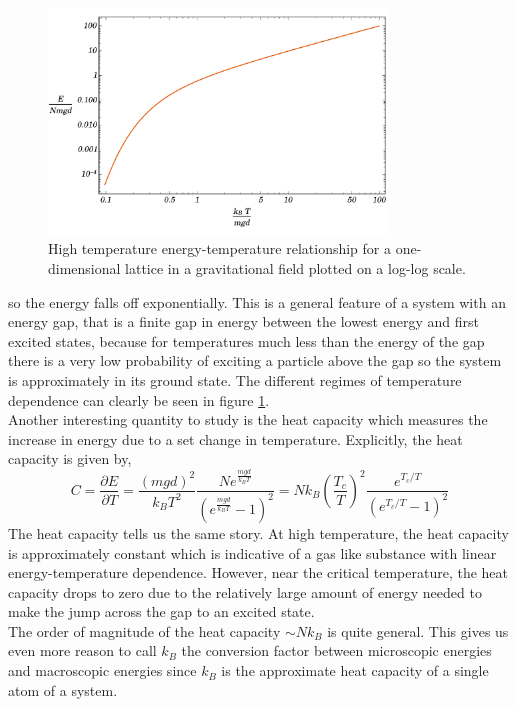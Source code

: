 \documentclass[11pt,a4paper]{article}
\newcommand{\pderiv}[2]{\frac{\partial{#1}}{\partial{#2}}}
\theoremstyle{theorem}
\theoremstyle{definition}
\theoremstyle{definition}
\theoremstyle{remark}
\theoremstyle{definition}
\theoremstyle{remark}
\begin{document}
\begin{figure}
\begin{center}
\includegraphics[width = 9cm, height = 6cm]{LogGravLatticeEnergy}
\caption{High temperature energy-temperature relationship for a one-dimensional lattice in a gravitational field plotted on a log-log scale.}
\label{loggravlattice}
\end{center}
\end{figure}
so the energy falls off exponentially. This is a general feature of a system with an energy gap, that is a finite gap in energy between the lowest energy and first excited states, because for temperatures much less than the energy of the gap there is a very low probability of exciting a particle above the gap so the system is approximately in its ground state. The different regimes of temperature dependence can clearly be seen in figure \ref{loggravlattice}. \bigskip\\
Another interesting quantity to study is the heat capacity which measures the increase in energy due to a set change in temperature. Explicitly, the heat capacity is given by,
\[ C = \pderiv{E}{T} = \frac{(mgd)^2}{k_B T^2} \frac{N e^{\frac{mgd}{k_B T}}}{(e^{\frac{mgd}{k_B T}} - 1)^2} = N k_B \left( \frac{T_c}{T} \right)^2 \frac{e^{T_c/T}}{(e^{T_c/T} - 1)^2} \]
The heat capacity tells us the same story. At high temperature, the heat capacity is approximately constant which is indicative of a gas like substance with linear energy-temperature dependence. However, near the critical temperature, the heat capacity drops to zero due to the relatively large amount of energy needed to make the jump across the gap to an excited state. \bigskip \\
The order of magnitude of the heat capacity $\sim N k_B$ is quite general. This gives us even more reason to call $k_B$ the conversion factor between microscopic energies and macroscopic energies since $k_B$ is the approximate heat capacity of a single atom of a system.  
\end{document}
